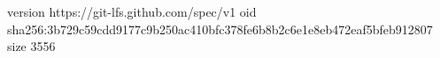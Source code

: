 version https://git-lfs.github.com/spec/v1
oid sha256:3b729c59cdd9177c9b250ac410bfc378fe6b8b2c6e1e8eb472eaf5bfeb912807
size 3556
